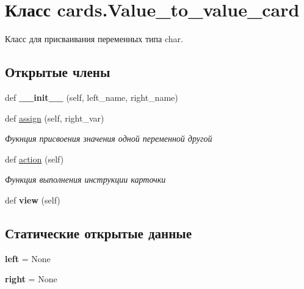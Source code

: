 \hypertarget{classcards_1_1_value__to__value__card}{}\section{Класс cards.\+Value\+\_\+to\+\_\+value\+\_\+card}
\label{classcards_1_1_value__to__value__card}


Класс для присваивания переменных типа char.  


\subsection*{Открытые члены}
\begin{DoxyCompactItemize}
\item 
\mbox{\label{classcards_1_1_value__to__value__card_aa00905a93fda5d2e9a1d06fd88db1c8d}} 
def {\bfseries \+\_\+\+\_\+init\+\_\+\+\_\+} (self, left\+\_\+name, right\+\_\+name)
\item 
def \mbox{\hyperlink{classcards_1_1_value__to__value__card_a4e0c59c1bfc953e4550ac296ddfa74d3}{assign}} (self, right\+\_\+var)
\begin{DoxyCompactList}\small\item\em Фукнция присвоения значения одной переменной другой \end{DoxyCompactList}\item 
def \mbox{\hyperlink{classcards_1_1_value__to__value__card_a53427d76f480c24a0790c07a0141c0c8}{action}} (self)
\begin{DoxyCompactList}\small\item\em Функция выполнения инструкции карточки \end{DoxyCompactList}\item 
\mbox{\label{classcards_1_1_value__to__value__card_ab7d470d22295187abe65346d417eb9cd}} 
def {\bfseries view} (self)
\end{DoxyCompactItemize}
\subsection*{Статические открытые данные}
\begin{DoxyCompactItemize}
\item 
\mbox{\label{classcards_1_1_value__to__value__card_a1ae201e7f1eb5872fdb5d624cb9621b7}} 
{\bfseries left} = None
\item 
\mbox{\label{classcards_1_1_value__to__value__card_a82c64cd978938d0e52c2eb80b383af06}} 
{\bfseries right} = None
\end{DoxyCompactItemize}


